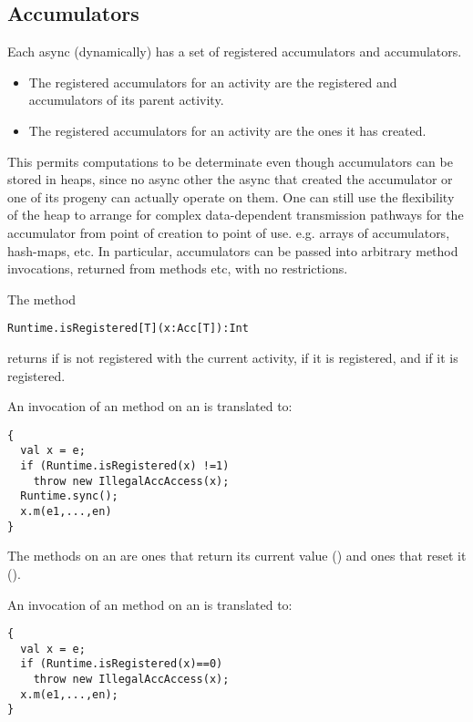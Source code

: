 \subsection{Accumulators}
Each async (dynamically) has a set of registered  accumulators
  and  accumulators.
  \begin{itemize}
  \item The registered  accumulators for an activity are
    the registered  and  accumulators of its
    parent activity.

  \item The registered  accumulators for an activity are
    the ones it has created.
  \end{itemize}

This permits computations to be determinate even though accumulators
can be stored in heaps, since no async other the async that created
the accumulator or one of its progeny can actually operate on them.
One can still use the flexibility of the heap to arrange for complex
data-dependent transmission pathways for the accumulator from point of
creation to point of use. e.g.{} arrays of accumulators, hash-maps,
etc. In particular, accumulators can be passed into arbitrary method
invocations, returned from methods etc, with no restrictions.

The method 
\begin{lstlisting}
Runtime.isRegistered[T](x:Acc[T]):Int  
\end{lstlisting}

\noindent returns  if  is not registered with the
current activity,  if it is  registered, and  if
it is  registered.


An invocation  of an  method on an  is
  translated to: 
\begin{lstlisting}
{ 
  val x = e;
  if (Runtime.isRegistered(x) !=1) 
    throw new IllegalAccAccess(x);
  Runtime.sync();
  x.m(e1,...,en)
}      
\end{lstlisting}
The  methods on an  are ones that return its
current value () and ones that reset it ().

An invocation  of an  method on an 
 is translated to: 
\begin{lstlisting}
{ 
  val x = e;
  if (Runtime.isRegistered(x)==0) 
    throw new IllegalAccAccess(x);
  x.m(e1,...,en);
}    
\end{lstlisting}


